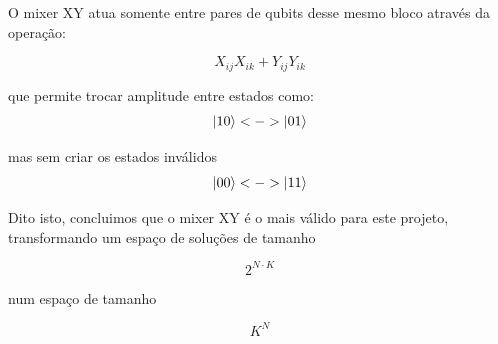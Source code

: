 \documentclass[12pt,a4paper]{article}
\begin{document}
O mixer XY atua somente entre pares de qubits desse mesmo bloco através da operação:

\begin{equation}
   X_{ij}X_{ik} + Y_{ij}Y_{ik}
\end{equation}

que permite trocar amplitude entre estados como:
\begin{equation}
   \ket{10} <-> \ket{01}
\end{equation}

mas sem criar os estados inválidos
\begin{equation}
   \ket{00} <-> \ket{11}
\end{equation}

Dito isto, concluimos que o mixer XY é o mais válido para este projeto, transformando um espaço de soluções de tamanho 

$$
2^{N \cdot K}
$$

num espaço de tamanho

$$
K^N
$$




\end{document}
